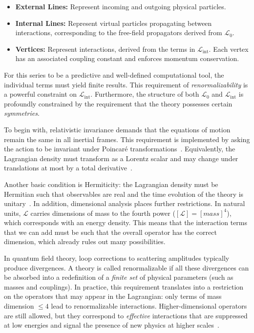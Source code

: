 \begin{itemize}
    \item \textbf{External Lines:} Represent incoming and outgoing physical particles.
    \item \textbf{Internal Lines:} Represent virtual particles propagating between interactions, corresponding to the free-field propagators derived from $\mathcal{L}_0$.
    \item \textbf{Vertices:} Represent interactions, derived from the terms in $\mathcal{L}_{\text{int}}$. Each vertex has an associated coupling constant and enforces momentum conservation.
\end{itemize}

For this series to be a predictive and well-defined computational tool, the individual terms must yield finite results. This requirement of \textit{renormalizability} is a powerful constraint on $\mathcal{L}_{\text{int}}$. Furthermore, the structure of both $\mathcal{L}_0$ and $\mathcal{L}_{\text{int}}$ is profoundly constrained by the requirement that the theory possesses certain \textit{symmetries}.

To begin with, relativistic invariance demands that the equations of motion remain the same in all inertial frames. This requirement is implemented by asking the action to be invariant under Poincaré transformations~\parencite{pall}. Equivalently, the Lagrangian density must transform as a Lorentz scalar and may change under translations at most by a total derivative~\parencite{jose1998classical}. 

Another basic condition is Hermiticity: the Lagrangian density must be Hermitian such that observables are real and the time evolution of the theory is unitary~\parencite{pall,peskin}. In addition, dimensional analysis places further restrictions. In natural units, $\mathcal{L}$ carries dimensions of mass to the fourth power ($[\mathcal{L}] = [mass]^4$), which corresponds with an  energy density. This means that the interaction terms that we can add must be such that the overall operator has the correct dimension, which already rules out many possibilities. 

In quantum field theory, loop corrections to scattering amplitudes typically produce divergences. A theory is called renormalizable if all these divergences can be absorbed into a redefinition of a \emph{finite set} of physical parameters (such as masses and couplings). In practice, this requirement translates into a restriction on the operators that may appear in the Lagrangian: only terms of mass dimension $\leq 4$ lead to renormalizable interactions. Higher-dimensional operators are still allowed, but they correspond to \emph{effective} interactions that are suppressed at low energies and signal the presence of new physics at higher scales~\parencite{peskin,Weinberg}. 

